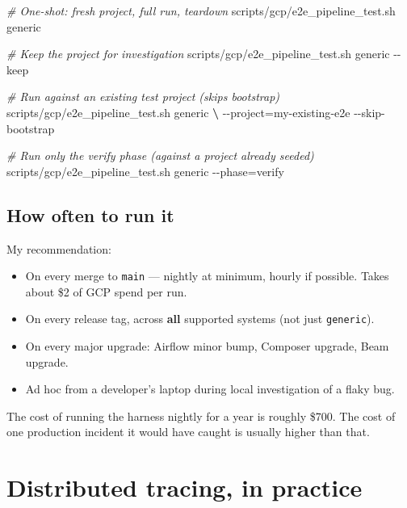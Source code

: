 \documentclass[
  11pt,
  british,
  oneside]{book}
\newenvironment{Shaded}{\begin{snugshade}}{\end{snugshade}}
\newcommand{\CommentTok}[1]{\textcolor[rgb]{0.56,0.35,0.01}{\textit{#1}}}
\newcommand{\ExtensionTok}[1]{#1}
\newcommand{\KeywordTok}[1]{\textcolor[rgb]{0.13,0.29,0.53}{\textbf{#1}}}
\newcommand{\NormalTok}[1]{#1}
\providecommand{\tightlist}{%
  \setlength{\itemsep}{0pt}\setlength{\parskip}{0pt}}
\begin{document}
\begin{Shaded}
\begin{Highlighting}[]
\CommentTok{\# One{-}shot: fresh project, full run, teardown}
\ExtensionTok{scripts/gcp/e2e\_pipeline\_test.sh}\NormalTok{ generic}

\CommentTok{\# Keep the project for investigation}
\ExtensionTok{scripts/gcp/e2e\_pipeline\_test.sh}\NormalTok{ generic {-}{-}keep}

\CommentTok{\# Run against an existing test project (skips bootstrap)}
\ExtensionTok{scripts/gcp/e2e\_pipeline\_test.sh}\NormalTok{ generic }\KeywordTok{\textbackslash{}}
  \ExtensionTok{{-}{-}project}\NormalTok{=my{-}existing{-}e2e {-}{-}skip{-}bootstrap}

\CommentTok{\# Run only the verify phase (against a project already seeded)}
\ExtensionTok{scripts/gcp/e2e\_pipeline\_test.sh}\NormalTok{ generic {-}{-}phase=verify}
\end{Highlighting}
\end{Shaded}

\hypertarget{how-often-to-run-it}{%
\subsection{How often to run it}\label{how-often-to-run-it}}

My recommendation:

\begin{itemize}
\tightlist
\item
  On every merge to \texttt{main} --- nightly at minimum, hourly if
  possible. Takes about \$2 of GCP spend per run.
\item
  On every release tag, across \textbf{all} supported systems (not just
  \texttt{generic}).
\item
  On every major upgrade: Airflow minor bump, Composer upgrade, Beam
  upgrade.
\item
  Ad hoc from a developer's laptop during local investigation of a flaky
  bug.
\end{itemize}

The cost of running the harness nightly for a year is roughly \$700. The
cost of one production incident it would have caught is usually higher
than that.

\hypertarget{distributed-tracing-in-practice}{%
\section{Distributed tracing, in
practice}\label{distributed-tracing-in-practice}}
\end{document}
